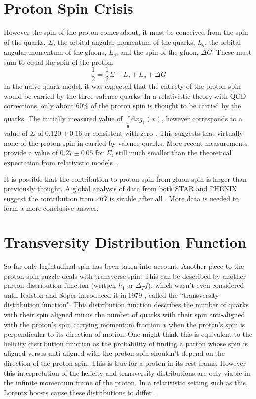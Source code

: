 \documentclass[letterpaper, abstract = on,listof=totoc, bibliography=totoc]{scrreprt}
\begin{document}
\section{Proton Spin Crisis}
However the spin of the proton comes about, it must be conceived from the spin of the quarks, $\Sigma$, the orbital angular momentum of the quarks, $L_q$, the orbital angular momentum of the gluons, $L_g$, and the spin of the gluon, $\Delta G$. These must sum to equal the spin of the proton.
\begin{equation}
\frac{1}{2} = \frac{1}{2}\Sigma + L_q + L_g + \Delta G
\end{equation}
In the naive quark model, it was expected that the entirety of the proton spin would be carried by the three valence quarks. In a relativistic theory with QCD corrections, only about 60\% of the proton spin is thought to be carried by the quarks. The initially measured value of $\int\limits_0^1 \text{d}x g_1(x)$, however corresponds to a value of $\Sigma$ of $0.120 \pm 0.16$ or consistent with zero \cite{jaffeWhereSpinComeFrom}. This suggests that virtually none of the proton spin in carried by valence quarks. More recent measurements provide a value of $0.27\pm 0.05$ for $\Sigma$, still much smaller than the theoretical expectation from relativistic models \cite{jaffeWhereSpinComeFrom}.  

It is possible that the contribution to proton spin from gluon spin is larger than previously thought. A global analysis of data from both STAR and PHENIX suggest the contribution from $\Delta G$ is sizable after all \cite{deFlorian:2014yva}. More data is needed to form a more conclusive answer. 

\section{Transversity Distribution Function}
So far only logintudinal spin has been taken into account. Another piece to the proton spin puzzle deals with transverse spin. This can be described by another parton distribution function (written $h_1$ or $\Delta_T f$), which wasn't even considered until Ralston and Soper introduced it in 1979 \cite{transIntroduced}, called the ``transversity distribution function". This distribution function describes the number of quarks with their spin aligned minus the number of quarks with their spin anti-aligned with the proton's spin carrying momentum fraction $x$ when the proton's spin is perpendicular to its direction of motion. One might think this is equivalent to the helicity distribution function as the probability of finding a parton whose spin is aligned versus anti-aligned with the proton spin shouldn't depend on the direction of the proton spin. This is true for a proton in its rest frame. However this interpretation of the helicity and transversity distributions are only viable in the infinite momentum frame of the proton. In a relativistic setting such as this, Lorentz boosts cause these distributions to differ \cite{BacchettaThesis}.
\end{document}
